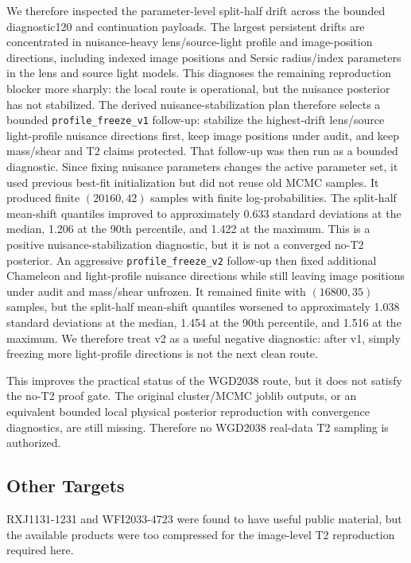 \documentclass[11pt]{article}
\begin{document}
We therefore inspected the parameter-level split-half drift across the bounded
diagnostic120 and continuation payloads. The largest persistent drifts are
concentrated in nuisance-heavy lens/source-light profile and image-position
directions, including indexed image positions and Sersic radius/index
parameters in the lens and source light models.
This diagnoses the remaining reproduction blocker more sharply: the local route
is operational, but the nuisance posterior has not stabilized.
The derived nuisance-stabilization plan therefore selects a bounded
\texttt{profile\_freeze\_v1} follow-up: stabilize the highest-drift lens/source
light-profile nuisance directions first, keep image positions under audit, and
keep mass/shear and T2 claims protected.
That follow-up was then run as a bounded diagnostic. Since fixing nuisance
parameters changes the active parameter set, it used previous best-fit
initialization but did not reuse old MCMC samples. It produced finite
\((20160,42)\) samples with finite log-probabilities. The split-half
mean-shift quantiles improved to approximately 0.633 standard deviations at
the median, 1.206 at the 90th percentile, and 1.422 at the maximum. This is a
positive nuisance-stabilization diagnostic, but it is not a converged no-T2
posterior.
An aggressive \texttt{profile\_freeze\_v2} follow-up then fixed additional
Chameleon and light-profile nuisance directions while still leaving image
positions under audit and mass/shear unfrozen. It remained finite with
\((16800,35)\) samples, but the split-half mean-shift quantiles worsened to
approximately 1.038 standard deviations at the median, 1.454 at the 90th
percentile, and 1.516 at the maximum. We therefore treat v2 as a useful
negative diagnostic: after v1, simply freezing more light-profile directions
is not the next clean route.

This improves the practical status of the WGD2038 route, but it does
not satisfy the no-T2 proof gate. The original cluster/MCMC joblib outputs,
or an equivalent bounded local physical posterior reproduction with
convergence diagnostics, are still missing. Therefore no WGD2038 real-data
T2 sampling is authorized.

\subsection{Other Targets}\label{other-targets}

RXJ1131-1231 and WFI2033-4723 were found to have useful public material,
but the available products were too compressed for the image-level T2
reproduction required here.
\end{document}
